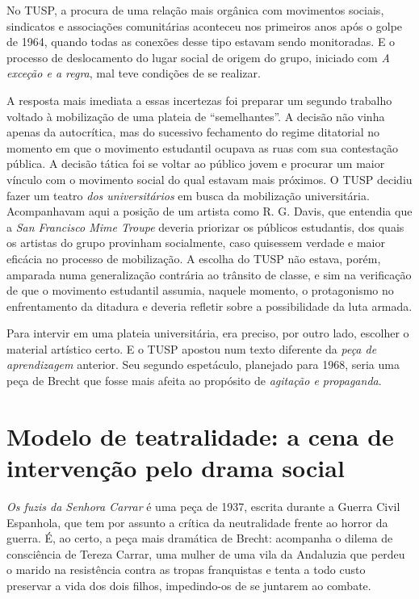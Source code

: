No TUSP, a procura de uma relação mais orgânica com movimentos sociais,
sindicatos e associações comunitárias aconteceu nos primeiros anos após
o golpe de 1964, quando todas as conexões desse tipo estavam sendo
monitoradas. E o processo de deslocamento do lugar social de origem do
grupo, iniciado com \textit{A} \textit{exceção e a regra}, mal teve condições
de se realizar.

A resposta mais imediata a essas incertezas foi preparar um segundo
trabalho voltado à mobilização de uma plateia de “semelhantes”. A
decisão não vinha apenas da autocrítica, mas do sucessivo fechamento do
regime ditatorial no momento em que o movimento estudantil ocupava as
ruas com sua contestação pública. A decisão tática foi se voltar ao
público jovem e procurar um maior vínculo com o movimento social do qual
estavam mais próximos. O TUSP decidiu fazer um teatro \textit{dos
universitários} em busca da mobilização universitária. Acompanhavam aqui
a posição de um artista como R. G. Davis, que entendia que a \textit{San
Francisco Mime Troupe} deveria priorizar os públicos estudantis, dos
quais os artistas do grupo provinham socialmente, caso quisessem verdade
e maior eficácia no processo de mobilização. A escolha do TUSP não
estava, porém, amparada numa generalização contrária ao trânsito de
classe, e sim na verificação de que o movimento estudantil assumia,
naquele momento, o protagonismo no enfrentamento da ditadura e deveria
refletir sobre a possibilidade da luta armada.

Para intervir em uma plateia universitária, era preciso, por outro lado,
escolher o material artístico certo. E o TUSP apostou num texto
diferente da \textit{peça de aprendizagem} anterior. Seu segundo
espetáculo, planejado para 1968, seria uma peça de Brecht que fosse mais
afeita ao propósito de \textit{agitação e propaganda}.

\section{Modelo de teatralidade: a cena de intervenção pelo drama social}

\textit{Os fuzis da Senhora Carrar} é uma peça de 1937, escrita durante a
Guerra Civil Espanhola, que tem por assunto a crítica da neutralidade
frente ao horror da guerra. É, ao certo, a peça mais dramática de
Brecht: acompanha o dilema de consciência de Tereza Carrar, uma mulher
de uma vila da Andaluzia que perdeu o marido na resistência contra as
tropas franquistas e tenta a todo custo preservar a vida dos dois
filhos, impedindo-os de se juntarem ao combate.

